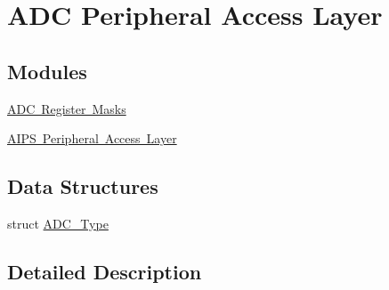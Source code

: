 \hypertarget{group___a_d_c___peripheral___access___layer}{}\section{A\+DC Peripheral Access Layer}
\label{group___a_d_c___peripheral___access___layer}
\subsection*{Modules}
\begin{DoxyCompactItemize}
\item 
\mbox{\hyperlink{group___a_d_c___register___masks}{A\+D\+C Register Masks}}
\item 
\mbox{\hyperlink{group___a_i_p_s___peripheral___access___layer}{A\+I\+P\+S Peripheral Access Layer}}
\end{DoxyCompactItemize}
\subsection*{Data Structures}
\begin{DoxyCompactItemize}
\item 
struct \mbox{\hyperlink{struct_a_d_c___type}{A\+D\+C\+\_\+\+Type}}
\end{DoxyCompactItemize}


\subsection{Detailed Description}
